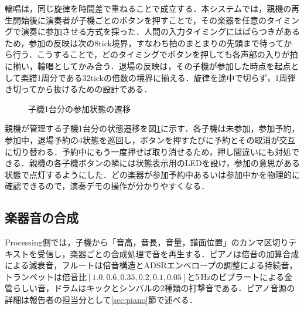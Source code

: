 \documentclass[uplatex,dvipdfmx]{jlreq}
\begin{document}
輪唱は，同じ旋律を時間差で重ねることで成立する．本システムでは，親機の再生開始後に演奏者が子機ごとのボタンを押すことで，その楽器を任意のタイミングで演奏に参加させる方式を採った．人間の入力タイミングにはばらつきがあるため，参加の反映は次の8tick境界，すなわち拍のまとまりの先頭まで待ってから行う．こうすることで，どのタイミングでボタンを押しても各声部の入りが拍に揃い，輪唱としてかみ合う．退場の反映は，その子機が参加した時点を起点として楽譜1周分である32tickの倍数の境界に揃える．旋律を途中で切らず，1周弾き切ってから抜けるための設計である．

\begin{figure}[tb]
\begin{center}
\end{center}
\caption{子機1台分の参加状態の遷移}
\label{fig:state}
\end{figure}

親機が管理する子機1台分の状態遷移を図\ref{fig:state}に示す．各子機は未参加，参加予約，参加中，退場予約の4状態を巡回し，ボタンを押すたびに予約とその取消が交互に切り替わる．予約中にもう一度押せば取り消せるため，押し間違いにも対処できる．親機の各子機ボタンの隣には状態表示用のLEDを設け，参加の意思がある状態で点灯するようにした．どの楽器が参加予約中あるいは参加中かを物理的に確認できるので，演奏デモの操作が分かりやすくなる．

\subsection{楽器音の合成}

Processing側では，子機から「音高，音長，音量，譜面位置」のカンマ区切りテキストを受信し，楽器ごとの合成処理で音を再生する．ピアノは倍音の加算合成による減衰音，フルートは倍音構造とADSRエンベロープの調整による持続音，トランペットは倍音比$[1.0, 0.6, 0.35, 0.2, 0.1, 0.05]$と5\,Hzのビブラートによる金管らしい音，ドラムはキックとシンバルの2種類の打撃音である．ピアノ音源の詳細は報告者の担当分として\ref{sec:piano}節で述べる．
\end{document}
